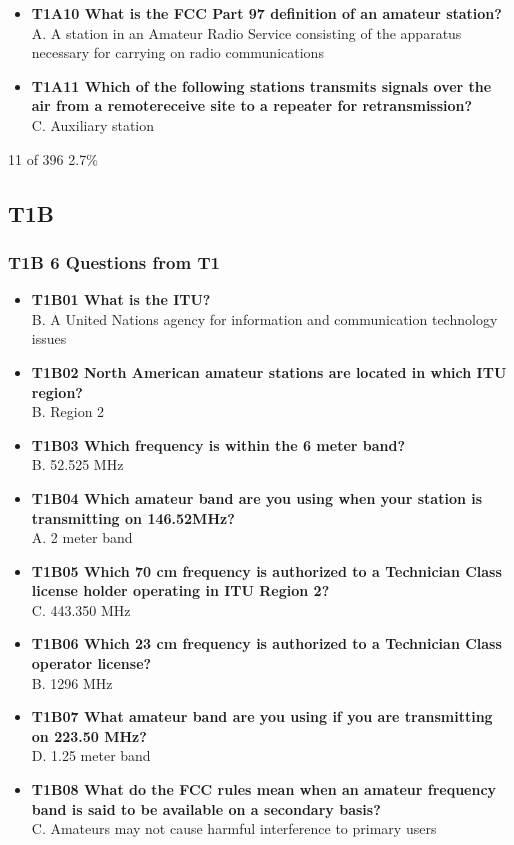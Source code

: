 \documentclass[10pt]{beamer}
\begin{document}
\begin{frame}
\begin{itemize}[<+->]
\item\textbf{T1A10 What is the FCC Part 97 definition of an amateur station?}\hfil \\ A. A station in an Amateur Radio Service consisting of the apparatus necessary for carrying on radio communications
\item\textbf{T1A11 Which of the following stations transmits signals over the air from a remotereceive site to a repeater for retransmission?} \hfil \\C. Auxiliary station
\end{itemize}
\tiny 11 of 396 2.7\%
\end{frame}
\subsection{T1B}
\begin{frame}
\frametitle{T1B 6 Questions from T1}
\begin{itemize}[<+->]
\tiny
\item\textbf{T1B01 What is the ITU?} \hfil \\ B. A United Nations agency for information and communication technology issues
\item\textbf{T1B02 North American amateur stations are located in which ITU region?} \hfil \\ B. Region 2
\item\textbf{T1B03 Which frequency is within the 6 meter band?} \hfil \\ B. 52.525 MHz
\item\textbf{T1B04 Which amateur band are you using when your station is transmitting on 146.52MHz?} \hfil \\ A. 2 meter band
\item\textbf{T1B05 Which 70 cm frequency is authorized to a Technician Class license holder operating in ITU Region 2? }\hfil \\ C. 443.350 MHz
\item\textbf{T1B06 Which 23 cm frequency is authorized to a Technician Class operator license?} \hfil \\ B. 1296 MHz
\item\textbf{T1B07 What amateur band are you using if you are transmitting on 223.50 MHz?} \hfil \\ D. 1.25 meter band
\item\textbf{T1B08 What do the FCC rules mean when an amateur frequency band is said to be available on a secondary basis?} \hfil \\ C. Amateurs may not cause harmful interference to primary users

\end{itemize}
\end{frame}
\end{document}
